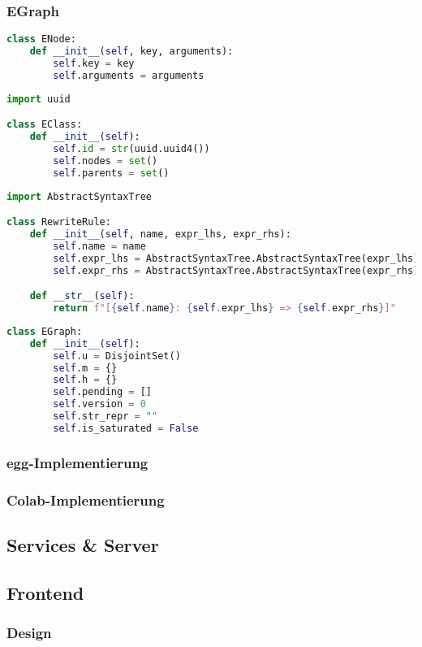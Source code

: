 \subsubsection{EGraph}

\begin{lstlisting}[language=Python, caption=Klasse \textit{ENode}]
class ENode:
    def __init__(self, key, arguments):
        self.key = key
        self.arguments = arguments
\end{lstlisting}

\begin{lstlisting}[language=Python, caption=Klasse \textit{EClass}]
import uuid

class EClass:
    def __init__(self):
        self.id = str(uuid.uuid4())
        self.nodes = set()
        self.parents = set()
\end{lstlisting}

\begin{lstlisting}[language=Python, caption=Klasse \textit{RewriteRule}]
import AbstractSyntaxTree

class RewriteRule:
    def __init__(self, name, expr_lhs, expr_rhs):
        self.name = name
        self.expr_lhs = AbstractSyntaxTree.AbstractSyntaxTree(expr_lhs)
        self.expr_rhs = AbstractSyntaxTree.AbstractSyntaxTree(expr_rhs)

    def __str__(self):
        return f"[{self.name}: {self.expr_lhs} => {self.expr_rhs}]"
\end{lstlisting}

\begin{lstlisting}[language=Python, caption=Klasse \textit{EGraph}]
class EGraph:
    def __init__(self):
        self.u = DisjointSet()
        self.m = {}
        self.h = {}
        self.pending = []
        self.version = 0
        self.str_repr = ""
        self.is_saturated = False
\end{lstlisting}

\subsubsection{egg-Implementierung}

\subsubsection{Colab-Implementierung}

\subsection{Services \& Server}

\subsection{Frontend}

\subsubsection{Design}
